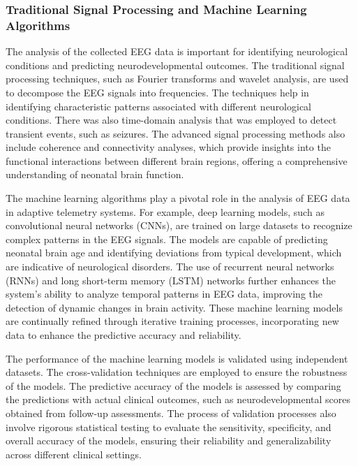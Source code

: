 \documentclass[12pt,journal,compsoc]{IEEEtran}
\begin{document}
\subsubsection{Traditional Signal Processing and Machine Learning Algorithms}

The analysis of the collected EEG data is important for identifying neurological conditions and predicting neurodevelopmental outcomes. The traditional signal processing techniques, such as Fourier transforms and wavelet analysis, are used to decompose the EEG signals into frequencies. The techniques help in identifying characteristic patterns associated with different neurological conditions. There was also time-domain analysis that was employed to detect transient events, such as seizures. The advanced signal processing methods also include coherence and connectivity analyses, which provide insights into the functional interactions between different brain regions, offering a comprehensive understanding of neonatal brain function.  

The machine learning algorithms play a pivotal role in the analysis of EEG data in adaptive telemetry systems. For example, deep learning models, such as convolutional neural networks (CNNs), are trained on large datasets to recognize complex patterns in the EEG signals. The models are capable of predicting neonatal brain age and identifying deviations from typical development, which are indicative of neurological disorders. The use of recurrent neural networks (RNNs) and long short-term memory (LSTM) networks further enhances the system's ability to analyze temporal patterns in EEG data, improving the detection of dynamic changes in brain activity. These machine learning models are continually refined through iterative training processes, incorporating new data to enhance the predictive accuracy and reliability. 

The performance of the machine learning models is validated using independent datasets. The cross-validation techniques are employed to ensure the robustness of the models. The predictive accuracy of the models is assessed by comparing the predictions with actual clinical outcomes, such as neurodevelopmental scores obtained from follow-up assessments. The process of validation processes also involve rigorous statistical testing to evaluate the sensitivity, specificity, and overall accuracy of the models, ensuring their reliability and generalizability across different clinical settings. 

\end{document}
